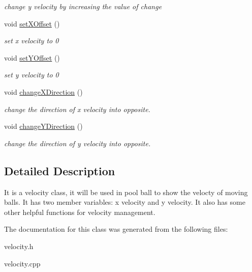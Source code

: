 \begin{DoxyCompactItemize}
\begin{DoxyCompactList}\small\item\em change y velocity by increasing the value of change \end{DoxyCompactList}\item 
\mbox{\label{class_velocity_a3a531f663840ebca863eee12edce6228}} 
void \mbox{\hyperlink{class_velocity_a3a531f663840ebca863eee12edce6228}{set\+X\+Offset}} ()
\begin{DoxyCompactList}\small\item\em set x velocity to 0 \end{DoxyCompactList}\item 
\mbox{\label{class_velocity_a0f40761e683af492d86156110921edba}} 
void \mbox{\hyperlink{class_velocity_a0f40761e683af492d86156110921edba}{set\+Y\+Offset}} ()
\begin{DoxyCompactList}\small\item\em set y velocity to 0 \end{DoxyCompactList}\item 
\mbox{\label{class_velocity_aca67fbc9b9aea417058bd305d75ef4ca}} 
void \mbox{\hyperlink{class_velocity_aca67fbc9b9aea417058bd305d75ef4ca}{change\+X\+Direction}} ()
\begin{DoxyCompactList}\small\item\em change the direction of x velocity into opposite. \end{DoxyCompactList}\item 
\mbox{\label{class_velocity_a943fd1b01734ee93fae40834f253ecce}} 
void \mbox{\hyperlink{class_velocity_a943fd1b01734ee93fae40834f253ecce}{change\+Y\+Direction}} ()
\begin{DoxyCompactList}\small\item\em change the direction of y velocity into opposite. \end{DoxyCompactList}\end{DoxyCompactItemize}


\subsection{Detailed Description}
It is a velocity class, it will be used in pool ball to show the velocty of moving balls. It has two member variables\+: x velocity and y velocity. It also has some other helpful functions for velocity management. 

The documentation for this class was generated from the following files\+:\begin{DoxyCompactItemize}
\item 
velocity.\+h\item 
velocity.\+cpp\end{DoxyCompactItemize}
